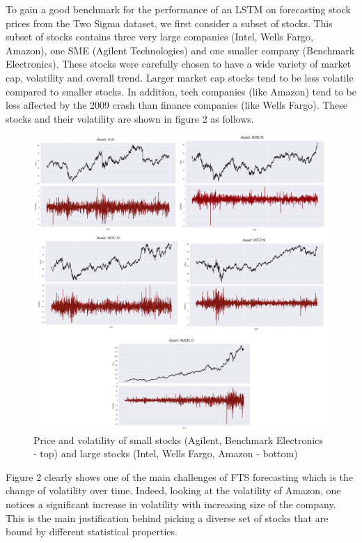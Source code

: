 \documentclass{article}
\begin{document}
To gain a good benchmark for the performance of an LSTM on forecasting stock prices from the Two Sigma dataset, we first consider a subset of stocks. This subset of stocks contains three very large companies (Intel, Wells Fargo, Amazon), one SME (Agilent Technologies) and one smaller company (Benchmark Electronics). These stocks were carefully chosen to have a wide variety of market cap, volatility and overall trend. Larger market cap stocks tend to be less volatile compared to smaller stocks. In addition, tech companies (like Amazon) tend to be less affected by the 2009 crash than finance companies (like Wells Fargo). These stocks and their volatility are shown in figure 2 as follows.
\begin{figure}[!h]
	\includegraphics[width=395pt]{Stocks.png}
    \caption{Price and volatility of small stocks (Agilent, Benchmark Electronics - top) and large stocks (Intel, Wells Fargo, Amazon - bottom)}
\end{figure}

Figure 2 clearly shows one of the main challenges of FTS forecasting which is the change of volatility over time. Indeed, looking at the volatility of Amazon, one notices a significant increase in volatility with increasing size of the company. This is the main justification behind picking a diverse set of stocks that are bound by different statistical properties.
\end{document}
